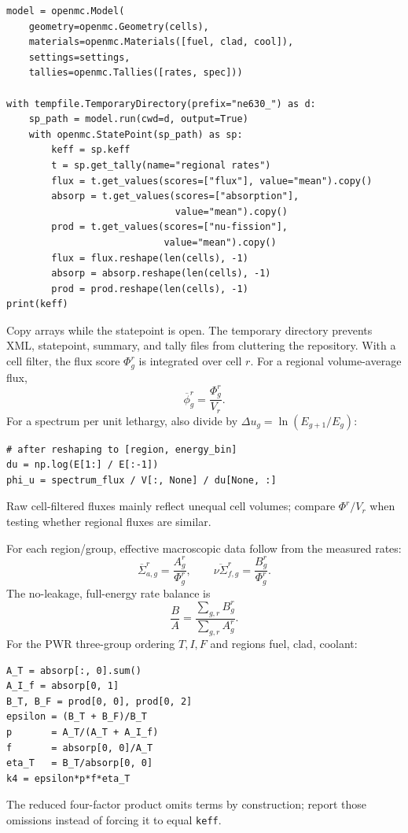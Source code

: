 \documentclass{ne630handout}
\begin{document}
\begin{lstlisting}
model = openmc.Model(
    geometry=openmc.Geometry(cells),
    materials=openmc.Materials([fuel, clad, cool]),
    settings=settings,
    tallies=openmc.Tallies([rates, spec]))

with tempfile.TemporaryDirectory(prefix="ne630_") as d:
    sp_path = model.run(cwd=d, output=True)
    with openmc.StatePoint(sp_path) as sp:
        keff = sp.keff
        t = sp.get_tally(name="regional rates")
        flux = t.get_values(scores=["flux"], value="mean").copy()
        absorp = t.get_values(scores=["absorption"],
                              value="mean").copy()
        prod = t.get_values(scores=["nu-fission"],
                            value="mean").copy()
        flux = flux.reshape(len(cells), -1)
        absorp = absorp.reshape(len(cells), -1)
        prod = prod.reshape(len(cells), -1)
print(keff)
\end{lstlisting}
Copy arrays while the statepoint is open.  The temporary directory prevents
XML, statepoint, summary, and tally files from cluttering the repository.
\colnext
{}
With a cell filter, the flux score $\Phi_g^r$ is integrated over cell $r$.
For a regional volume-average flux,
\[
 \overline\phi_g^r=\frac{\Phi_g^r}{V_r}.
\]
For a spectrum per unit lethargy, also divide by
$\Delta u_g=\ln(E_{g+1}/E_g)$:
\begin{lstlisting}
# after reshaping to [region, energy_bin]
du = np.log(E[1:] / E[:-1])
phi_u = spectrum_flux / V[:, None] / du[None, :]
\end{lstlisting}
Raw cell-filtered fluxes mainly reflect unequal cell volumes; compare
$\Phi^r/V_r$ when testing whether regional fluxes are similar.

For each region/group, effective macroscopic data follow from the measured
rates:
\[
 \overline\Sigma_{a,g}^r=\frac{A_g^r}{\Phi_g^r},\qquad
 \overline{\nu\Sigma}_{f,g}^r=\frac{B_g^r}{\Phi_g^r}.
\]
The no-leakage, full-energy rate balance is
\[
 \frac BA=\frac{\sum_{g,r}B_g^r}{\sum_{g,r}A_g^r}.
\]
For the PWR three-group ordering $T,I,F$ and regions fuel, clad, coolant:
\begin{lstlisting}
A_T = absorp[:, 0].sum()
A_I_f = absorp[0, 1]
B_T, B_F = prod[0, 0], prod[0, 2]
epsilon = (B_T + B_F)/B_T
p       = A_T/(A_T + A_I_f)
f       = absorp[0, 0]/A_T
eta_T   = B_T/absorp[0, 0]
k4 = epsilon*p*f*eta_T
\end{lstlisting}
The reduced four-factor product omits terms by construction; report those
omissions instead of forcing it to equal \texttt{keff}.
\end{document}
